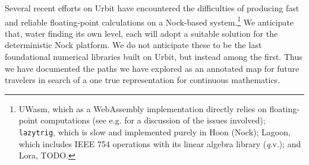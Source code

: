 \documentclass[twoside]{article}
\begin{document}
Several recent efforts on Urbit have encountered the difficulties of producing fast and reliable floating-point calculations on a Nock-based system.\footnote{UWasm, which as a WebAssembly implementation directly relies on floating-point computations \citep{UWasm} (see e.g. \citet{KloudKoder2022} for a discussion of the issues involved); \texttt{lazytrig}, which is slow and implemented purely in Hoon (Nock); Lagoon, which includes IEEE 754 operations with its linear algebra library ({\emph q.v.}); and Lora, TODO.}  We anticipate that, water finding its own level, each will adopt a suitable solution for the deterministic Nock platform.  We do not anticipate these to be the last foundational numerical libraries built on Urbit, but instead among the first.  Thus we have documented the paths we have explored as an annotated map for future travelers in search of a one true representation for continuous mathematics.



\end{document}
